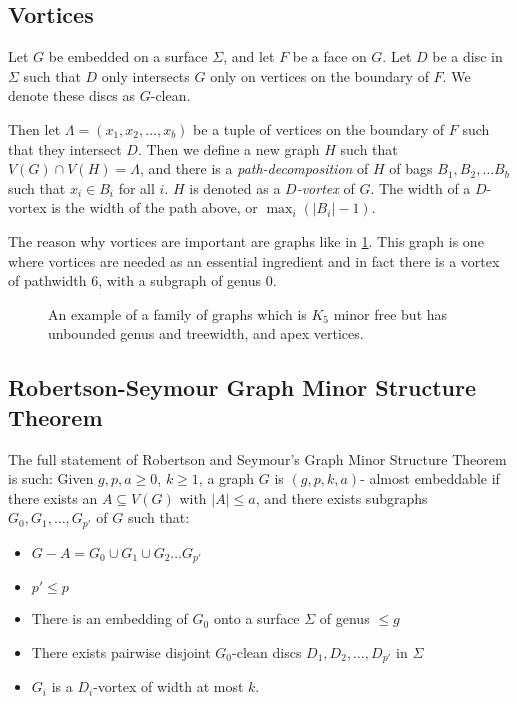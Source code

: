 \subsection{Vortices}\label{sssec:vortices}
Let \(G\) be embedded on a surface \(\Sigma\), and let \(F\) be a face on \(G\). Let \(D\) be a disc in \(\Sigma\) such that \(D\) only intersects \(G\) only on vertices on the boundary of \(F\). We denote these discs as \(G\)-clean. 

Then let \(\Lambda = (x_1, x_2, \ldots, x_b)\) be a tuple of vertices on the boundary of \(F\) such that they intersect \(D\). Then we define a new graph \(H\) such that \(V(G) \cap V(H) = \Lambda\), and there is a \textit{path-decomposition} of \(H\) of bags \(B_1, B_2, \ldots B_b\) such that \(x_i \in B_i\) for all \(i\). \(H\) is denoted as a \textit{\(D\)-vortex} of \(G\). The width of a \(D\)-vortex is the width of the path above, or \(\max_i(|B_i| - 1)\). 

The reason why vortices are important are graphs like in \cref{fig:tenniscourt}. This graph is one where vortices are needed as an essential ingredient and in fact there is a vortex of pathwidth 6, with a subgraph of genus 0.

\begin{figure}[h]
	\centering
	
	\caption{An example of a family of graphs which is \(K_5\) minor free but has unbounded genus and treewidth, and apex vertices. }
	\label{fig:tenniscourt}
\end{figure}
\subsection{Robertson-Seymour Graph Minor Structure Theorem}\label{ssec:Robertson_Seymour_Graph_Structure}
The full statement of Robertson and Seymour's Graph Minor Structure Theorem \cite{robertsonGraphMinorsXVI2003}is such:
Given \(g, p, a \geq 0\), \(k \geq 1\), a graph \(G\) is \((g, p, k, a)\)- almost embeddable if there exists an \(A \subseteq V(G)\) with \(|A| \leq a\), and there exists subgraphs \(G_0, G_1, \ldots,  G_{p'}\) of \(G\) such that:
\begin{itemize}
	\item \(G - A = G_0 \cup G_1 \cup G_2 \ldots G_{p'}\)
	\item \(p' \leq p\)
	\item There is an embedding of \(G_0\) onto a surface \(\Sigma\) of genus \(\leq g\)
	\item There exists pairwise disjoint \(G_0\)-clean discs \(D_1, D_2, \ldots, D_{p'}\) in \(\Sigma\)
	\item \(G_i\) is a \(D_i\)-vortex of width at most \(k\).
\end{itemize}


